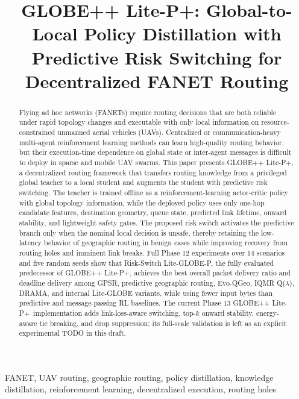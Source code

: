 \documentclass[conference]{IEEEtran}
\title{GLOBE++ Lite-P+: Global-to-Local Policy Distillation with Predictive Risk Switching for Decentralized FANET Routing}
\author{
\IEEEauthorblockN{Author information omitted for draft review}
\IEEEauthorblockA{
Department / Laboratory information to be completed\\
Email: to be completed
}
}
\newcommand{\method}{GLOBE++ Lite-P+}
\newcommand{\phaseTwelve}{Risk-Switch Lite-GLOBE-P}
\begin{document}
\maketitle

\begin{abstract}
Flying ad hoc networks (FANETs) require routing decisions that are both reliable under rapid topology changes and executable with only local information on resource-constrained unmanned aerial vehicles (UAVs). Centralized or communication-heavy multi-agent reinforcement learning methods can learn high-quality routing behavior, but their execution-time dependence on global state or inter-agent messages is difficult to deploy in sparse and mobile UAV swarms. This paper presents \method, a decentralized routing framework that transfers routing knowledge from a privileged global teacher to a local student and augments the student with predictive risk switching. The teacher is trained offline as a reinforcement-learning actor-critic policy with global topology information, while the deployed policy uses only one-hop candidate features, destination geometry, queue state, predicted link lifetime, onward stability, and lightweight safety gates. The proposed risk switch activates the predictive branch only when the nominal local decision is unsafe, thereby retaining the low-latency behavior of geographic routing in benign cases while improving recovery from routing holes and imminent link breaks. Full Phase 12 experiments over 14 scenarios and five random seeds show that \phaseTwelve, the fully evaluated predecessor of \method, achieves the best overall packet delivery ratio and deadline delivery among GPSR, predictive geographic routing, Evo-QGeo, IQMR Q($\lambda$), DRAMA, and internal Lite-GLOBE variants, while using fewer input bytes than predictive and message-passing RL baselines. The current Phase 13 \method\ implementation adds link-loss-aware switching, top-$k$ onward stability, energy-aware tie breaking, and drop suppression; its full-scale validation is left as an explicit experimental TODO in this draft.
\end{abstract}

\begin{IEEEkeywords}
FANET, UAV routing, geographic routing, policy distillation, knowledge distillation, reinforcement learning, decentralized execution, routing holes
\end{IEEEkeywords}














\end{document}
